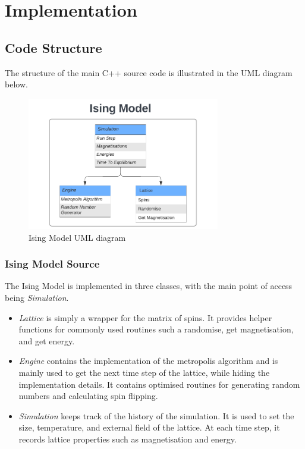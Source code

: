 \documentclass[a4paper, 12pt]{article}
\begin{document}
    \newpage
    \section{Implementation}

	\subsection{Code Structure}
	The structure of the main C++ source code is illustrated in the UML diagram below.
\begin{figure}[H]
\centering
\includegraphics[width=0.75\textwidth]{./resources/ising_UML_diagram.png}
\caption{Ising Model UML diagram}
\end{figure}
	
	\subsubsection{Ising Model Source}
	The Ising Model is implemented in three classes, with the main point of access being {\it Simulation}. 
	\begin{itemize}
		\item {\it Lattice} is simply a wrapper for the matrix of spins. It provides helper functions for commonly used routines such a randomise, get magnetisation, and get energy. 

		\item {\it Engine} contains the implementation of the metropolis algorithm and is mainly used to get the next time step of the lattice, while hiding the implementation details. It contains optimised routines for generating random numbers and calculating spin flipping.

		\item {\it Simulation} keeps track of the history of the simulation. It is used to set the size, temperature, and external field of the lattice. At each time step, it records lattice properties such as magnetisation and energy.
	\end{itemize}
\end{document}
